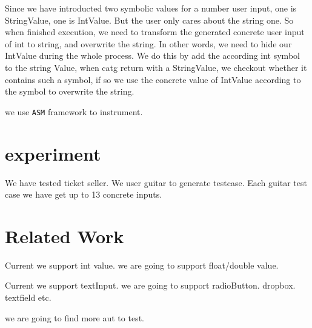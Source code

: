 \documentclass{article}
\begin{document}
Since we have introducted two symbolic values for a number user input, one is StringValue, one is IntValue. But the user only cares about the string one. So when finished execution, we need to transform the generated concrete user input of int to string, and overwrite the string. In other words, we need to hide our IntValue during the whole process. We do this by add the according int symbol to the string Value, when catg return with a StringValue, we checkout whether it contains such a symbol, if so we use the concrete value of IntValue according to the symbol to overwrite the string.


we use \texttt{ASM} framework to instrument.

\section{experiment}
We have tested ticket seller. We user guitar to generate testcase. Each guitar test case we have get up to 13 concrete inputs.


\section{Related Work}\label{section:relatedwork}
Current we support int value.
we are going to support float/double value.

Current we support textInput.
we are going to support radioButton. dropbox. textfield etc.

we are going to find more aut to test.
\end{document}
